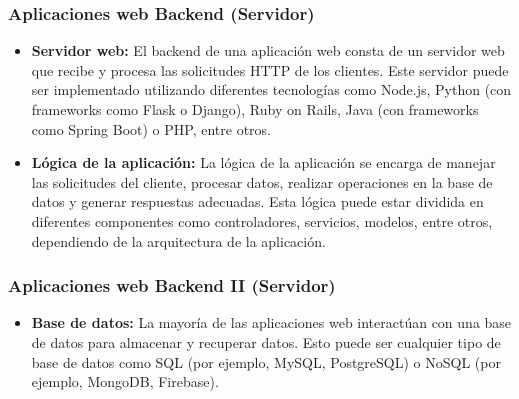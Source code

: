 \begin{frame}
	\frametitle{Aplicaciones web Backend (Servidor)}
	
	\begin{itemize}
		\item \textbf{Servidor web:} El backend de una aplicación web consta de un servidor web que recibe y procesa las solicitudes HTTP de los clientes. Este servidor puede ser implementado utilizando diferentes tecnologías como Node.js, Python (con frameworks como Flask o Django), Ruby on Rails, Java (con frameworks como Spring Boot) o PHP, entre otros.
		
		\item \textbf{Lógica de la aplicación:} La lógica de la aplicación se encarga de manejar las solicitudes del cliente, procesar datos, realizar operaciones en la base de datos y generar respuestas adecuadas. Esta lógica puede estar dividida en diferentes componentes como controladores, servicios, modelos, entre otros, dependiendo de la arquitectura de la aplicación.
		
	\end{itemize}	
\end{frame}

\begin{frame}
	\frametitle{Aplicaciones web Backend II (Servidor)}
	
	\begin{itemize}
		\item \textbf{Base de datos:} La mayoría de las aplicaciones web interactúan con una base de datos para almacenar y recuperar datos. Esto puede ser cualquier tipo de base de datos como SQL (por ejemplo, MySQL, PostgreSQL) o NoSQL (por ejemplo, MongoDB, Firebase).
		
	\end{itemize}	
\end{frame}

